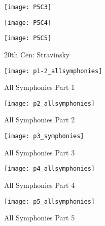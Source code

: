 \begin{figure}
\centering
\begin{minipage}{.5\textwidth}
  \centering
  \texttt{[image: P5C3]}
  \label{fig:test1}
\end{minipage}%
\begin{minipage}{.5\textwidth}
  \centering
  \texttt{[image: P5C4]}
  \label{fig:test2}
\end{minipage}
\end{figure}

\begin{figure}[h]
\caption{20th Cen: Stravinsky}
\centering
\texttt{[image: P5C5]}
\end{figure}

\begin{figure}[h]
\caption{All Symphonies Part 1}
\centering
\texttt{[image: p1-2\_allsymphonies]}
\end{figure}

\begin{figure}[h]
\caption{All Symphonies Part 2}
\centering
\texttt{[image: p2\_allsymphonies]}
\end{figure}

\begin{figure}[h]
\caption{All Symphonies Part 3}
\centering
\texttt{[image: p3\_symphonies]}
\end{figure}

\begin{figure}[h]
\caption{All Symphonies Part 4}
\centering
\texttt{[image: p4\_allsymphonies]}
\end{figure}

\begin{figure}[h]
\caption{All Symphonies Part 5}
\centering
\texttt{[image: p5\_allsymphonies]}
\end{figure}